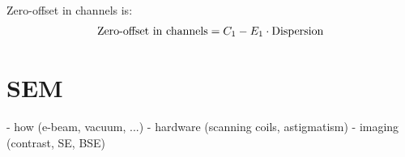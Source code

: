 Zero-offset in channels is:
\begin{equation}
    \label{eq:theory:calibration:offset}
    \textnormal{Zero-offset in channels} = C_1 - E_1 \cdot \textnormal{Dispersion}
\end{equation}



\section{SEM}
\label{sec:theory:sem}


- how (e-beam, vacuum, ...)
- hardware (scanning coils, astigmatism)
- imaging (contrast, SE, BSE)






